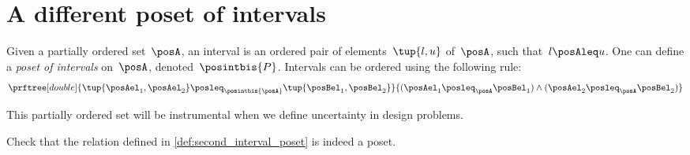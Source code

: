 \section{A different poset of intervals}
\begin{definition}
\label{def:second_interval_poset}
Given a partially ordered set~$\posA$, an interval is an ordered pair of elements~$\tup{l,u}$ of~$\posA$, such that~$l\posAleq u$.
One can define a \emph{poset of intervals} on~$\posA$, denoted~$\posintbis{P}$. Intervals can be ordered using the following rule:
\begin{equation}
    \prftree[double]{\tup{\posAel_1,\posAel_2}\posleq_{\posintbis{\posA}}\tup{\posBel_1,\posBel_2}}{(\posAel_1\posleq_\posA \posBel_1) \wedge (\posAel_2\posleq_\posA \posBel_2)}
\end{equation}
\end{definition}

This partially ordered set will be instrumental when we define uncertainty in design problems.

\begin{exercise}
    Check that the relation defined in \cref{def:second_interval_poset} is indeed a poset.
\end{exercise}
